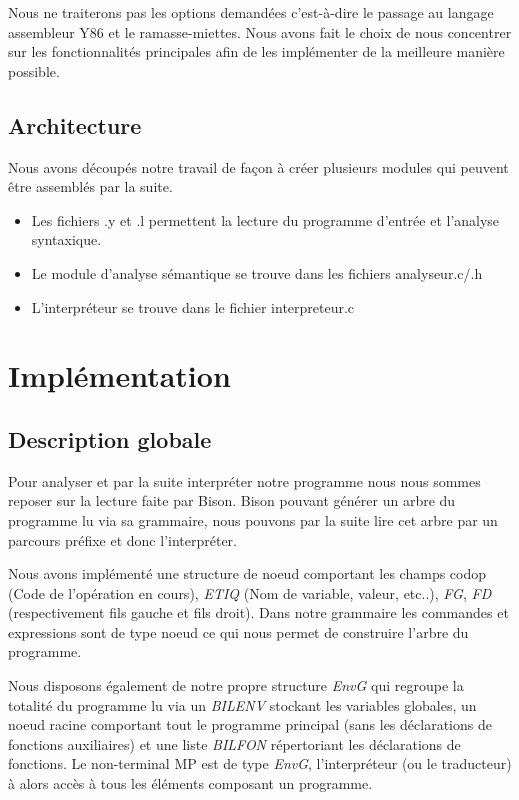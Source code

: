 ﻿\documentclass[10pt,a4paper]{article}
\begin{document}
Nous ne traiterons pas les options demandées c'est-à-dire le passage au langage assembleur Y86 et le ramasse-miettes.
Nous avons fait le choix de nous concentrer sur les fonctionnalités principales afin de les implémenter de la meilleure manière possible.

\subsection{Architecture}
Nous avons découpés notre travail de façon à créer plusieurs modules qui peuvent être assemblés par la suite.\\

\begin{itemize}
    \item Les fichiers .y et .l permettent la lecture du programme d'entrée et l'analyse syntaxique.
    \item Le module d'analyse sémantique se trouve dans les fichiers analyseur.c/.h
    \item L'interpréteur se trouve dans le fichier interpreteur.c
\end{itemize}



\section{Implémentation}
\subsection{Description globale}
Pour analyser et par la suite interpréter notre programme nous nous sommes reposer sur la lecture faite par Bison.
Bison pouvant générer un arbre du programme lu via sa grammaire, nous pouvons par la suite lire cet arbre par un parcours préfixe et donc l'interpréter.

Nous avons implémenté une structure de noeud comportant les champs codop (Code de l'opération en cours), \textit{ETIQ} (Nom de variable, valeur, etc..), \textit{FG}, \textit{FD} 
(respectivement fils gauche et fils droit). Dans notre grammaire les commandes et expressions sont de type noeud ce qui nous permet de construire l'arbre du programme.

Nous disposons également de notre propre structure \textit{EnvG} qui regroupe la totalité du programme lu via un \textit{BILENV} stockant les variables globales, un noeud 
racine comportant tout le programme principal (sans les déclarations de fonctions auxiliaires) et une liste \textit{BILFON} répertoriant les déclarations de fonctions. 
Le non-terminal MP est de type \textit{EnvG}, l'interpréteur (ou le traducteur) à alors accès à tous les éléments composant un programme.
\end{document}
